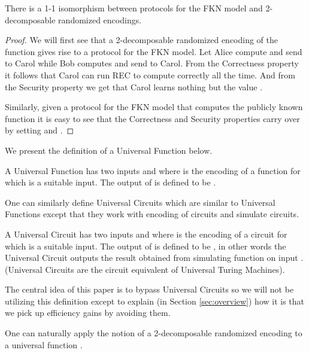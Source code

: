 \begin{lemma}
\label{lemma:FKN2decomp}
There is  a 1-1  isomorphism between protocols  for the FKN  model and
2-decomposable randomized encodings.
\end{lemma}
\begin{proof}
  We will first  see that a 2-decomposable randomized  encoding of the
  function   gives rise to a  protocol for the  FKN model. Let
  Alice compute and send   to Carol while Bob computes
  and send  to Carol. From the Correctness property it
  follows    that    Carol    can   run    REC  to  compute     correctly  all  the
  time.  And from  the  Security  property we  get  that Carol  learns
  nothing but the value .

  Similarly,  given a  protocol for  the FKN  model that  computes the
  publicly  known  function    it  is easy  to  see  that  the
  Correctness and Security properties  carry over by setting  and .
\end{proof}

We present  the definition of  a Universal Function below.  

\begin{definition}
A Universal Function  has  two inputs  and   where
 is  the encoding of a function  for which  is  a suitable input.
The output  of  is  defined to be .
\end{definition}

One  can similarly  define  Universal Circuits  which  are similar  to
Universal Functions  except that they  work with encoding  of circuits
and simulate circuits.
\begin{definition}
A Universal Circuit  has  two inputs  and   where
 is  the encoding of a circuit  for which  is  a suitable input.
The output  of  is  defined to be ,  in other
words  the   Universal  Circuit  outputs  the   result  obtained  from
simulating  function   on  input .  (Universal  Circuits are  the
circuit equivalent of Universal Turing Machines).
\end{definition}

The central idea  of this paper is to bypass  Universal Circuits so we
will not  be utilizing this  definition except to explain  (in Section
\ref{sec:overview})  how it  is that  we pick  up efficiency  gains by
avoiding them.


One  can naturally  apply the  notion of  a  2-decomposable randomized
encoding to a universal function .

